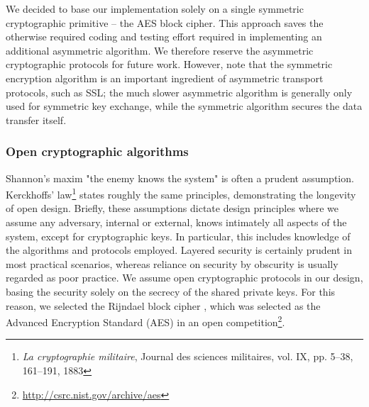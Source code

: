 We decided to base our implementation solely on a single symmetric cryptographic primitive -- the AES block cipher. This approach saves the otherwise required coding and testing effort required in implementing an additional asymmetric algorithm. We therefore reserve the asymmetric cryptographic protocols for future work. However, note that the symmetric encryption algorithm is an important ingredient of asymmetric transport protocols, such as SSL; the much slower asymmetric algorithm is generally only used for symmetric key exchange, while the symmetric algorithm secures the data transfer itself.


\subsubsection{Open cryptographic algorithms}

Shannon's maxim "the enemy knows the system" is often a prudent assumption. Kerckhoffs' law\footnote{\textit{La cryptographie militaire}, Journal des sciences militaires, vol. IX, pp. 5--38, 161–191, 1883} states roughly the same principles, demonstrating the longevity of open design. Briefly, these assumptions dictate design principles where we assume any adversary, internal or external, knows intimately all aspects of the system, except for cryptographic keys. In particular, this includes knowledge of the algorithms and protocols employed. Layered security is certainly prudent in most practical scenarios, whereas reliance on security by obscurity is usually regarded as poor practice. We assume open cryptographic protocols in our design, basing the security solely on the secrecy of the shared private keys. For this reason, we selected the Rijndael block cipher , which was selected as the Advanced Encryption Standard (AES) in an open competition\footnote{\url{http://csrc.nist.gov/archive/aes}}.

